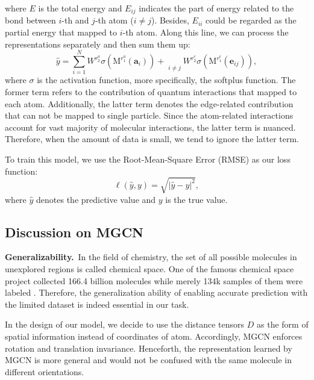 \documentclass[letterpaper]{article} \usepackage{bm}
\begin{document}
\noindent where $E$ is the total energy and $E_{ij}$ indicates the part of energy related to the bond between $i$-th and $j$-th atom ($i\neq j$). Besides, $E_{ii}$ could be regarded as the partial energy that mapped to $i$-th atom. Along this line, we can process the representations separately and then sum them up:   
  \begin{equation}
\hat{y} =\sum_{i=1}^N W^{r^a_{2}}\sigma(\mathrm{M}^{r^a_{1}}(\bm{a}_i)) +  \mathop{\sum\limits_{i=1}^N\sum\limits_{j=1}^N}\limits_{i\neq j} W^{r^e_{2}}\sigma(\mathrm{M}^{r^e_{1}}(\bm{e}_{ij})), 
\end{equation}     
\noindent where $\sigma$ is the activation function, more specifically, the softplus function. The former term refers to the contribution of quantum interactions that mapped to each atom. Additionally, the latter term denotes the edge-related contribution that can not be mapped to single particle. Since the atom-related interactions account for vast majority of molecular interactions, the latter term is nuanced. Therefore, when the amount of data is small, we tend to ignore the latter term.



 To train this model, we use the Root-Mean-Square Error (RMSE) as our loss function: 
   \begin{equation}
     \ell(\hat{y},y)=\sqrt{|\hat{y}-y|^2},
 \end{equation}   
 where $\hat{y}$ denotes the predictive value and $y$ is the true value. 


\subsection{Discussion on MGCN} 

\textbf{Generalizability.}\   
In the field of chemistry, the set of all possible molecules in unexplored regions is called chemical space. One of the famous chemical space project \cite{Ruddigkeit2012EnumerationO1} collected 166.4 billion molecules while merely 134k samples of them were labeled \cite{ramakrishnan2015many}. Therefore, the generalization ability of enabling accurate prediction with the limited dataset is indeed essential in our task.

In the design of our model, we decide to use the distance tensors $D$ as the form of spatial information instead of coordinates of atom. Accordingly, MGCN enforces rotation and translation invariance. Henceforth, the representation learned by MGCN is more general and would not be confused with the same molecule in different orientations.  
\end{document}
